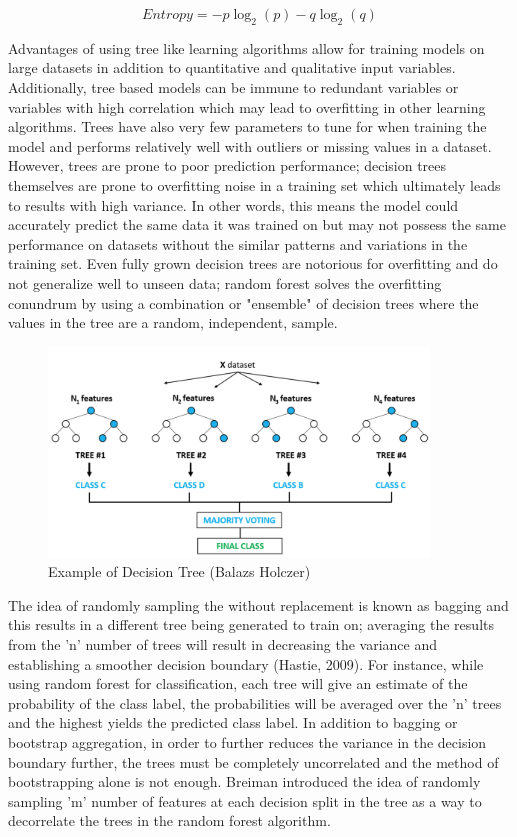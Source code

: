 \documentclass{llncs}
\begin{document}
\begin{equation}
Entropy = -p\log_{2}(p) - q\log_{2}(q)
\end{equation}


Advantages of using tree like learning algorithms allow for training models on large datasets in addition to quantitative and qualitative input variables. Additionally, tree based models can be immune to redundant variables or variables with high correlation which may lead to overfitting in other learning algorithms. Trees have also very few parameters to tune for when training the model and performs relatively well with outliers or missing values in a dataset. However, trees are prone to poor prediction performance; decision trees themselves are prone to overfitting noise in a training set which ultimately leads to results with high variance. In other words, this means the model could accurately predict the same data it was trained on but may not possess the same performance on datasets without the similar patterns and variations in the training set. Even fully grown decision trees are notorious for overfitting and do not generalize well to unseen data; random forest solves the overfitting conundrum by using a combination or "ensemble" of decision trees where the values in the tree are a random, independent, sample. 


\begin{figure}
\centering
\includegraphics[width=0.90\textwidth]{randomforest.png}
\caption{Example of Decision Tree (Balazs Holczer)}
\end{figure}


The idea of randomly sampling the without replacement is known as bagging and this results in a different tree being generated to train on; averaging the results from the 'n' number of trees will result in decreasing the variance and establishing a smoother decision boundary (Hastie, 2009). For instance, while using random forest for classification, each tree will give an estimate of the probability of the class label, the probabilities will be averaged over the 'n' trees and the highest yields the predicted class label. In addition to bagging or bootstrap aggregation, in order to further reduces the variance in the decision boundary further, the trees must be completely uncorrelated and the method of bootstrapping alone is not enough. Breiman introduced the idea of randomly sampling 'm' number of features at each decision split in the tree as a way to decorrelate the trees in the random forest algorithm.  
\end{document}
